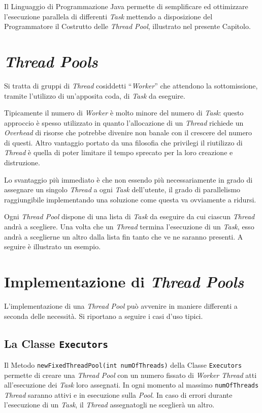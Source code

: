 Il Linguaggio di Programmazione Java permette di semplificare ed ottimizzare l'esecuzione parallela di differenti \textit{Task} mettendo a disposizione del Programmatore il Costrutto delle \textit{Thread Pool}, illustrato nel presente Capitolo.

\section{\textit{Thread Pools}}
Si tratta di gruppi di \textit{Thread} cosiddetti ``\textit{Worker}'' che attendono la sottomissione, tramite l'utilizzo di un'apposita coda, di \textit{Task} da eseguire\cite{ThreadPool_JavaTutorial}. \par
Tipicamente il numero di \textit{Worker} è molto minore del numero di \textit{Task}: questo approccio è spesso utilizzato in quanto l'allocazione di un \textit{Thread} richiede un \textit{Overhead} di risorse che potrebbe divenire non banale con il crescere del numero di questi. Altro vantaggio portato da una filosofia che privilegi il riutilizzo di \textit{Thread} è quella di poter limitare il tempo sprecato per la loro creazione e distruzione. \par
Lo svantaggio più immediato è che non essendo più necessariamente in grado di assegnare un singolo \textit{Thread} a ogni \textit{Task} dell'utente, il grado di parallelismo raggiungibile implementando una soluzione come questa va ovviamente a ridursi. \par
Ogni \textit{Thread Pool} dispone di una lista di \textit{Task} da eseguire da cui ciascun \textit{Thread} andrà a scegliere. Una volta che un \textit{Thread} termina l'esecuzione di un \textit{Task}, esso andrà a sceglierne un altro dalla lista fin tanto che ve ne saranno presenti. A seguire è illustrato un esempio.


\section{Implementazione di \textit{Thread Pools}}
L'implementazione di una \textit{Thread Pool} può avvenire in maniere differenti a seconda delle necessità. Si riportano a seguire i casi d'uso tipici.
\subsection{La Classe \texttt{Executors}}
Il Metodo \texttt{newFixedThreadPool(int numOfThreads)} della Classe \texttt{Executors}\cite{Executors_JavaDocs} permette di creare una \textit{Thread Pool} con un numero fissato di \textit{Worker Thread} atti all'esecuzione dei \textit{Task} loro assegnati. In ogni momento al massimo \texttt{numOfThreads} \textit{Thread} saranno attivi e in esecuzione sulla \textit{Pool}. In caso di errori durante l'esecuzione di un \textit{Task}, il \textit{Thread} assegnatogli ne sceglierà un altro.
